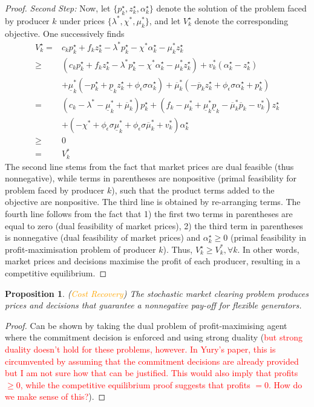 \documentclass{article}
\newtheorem{proposition}{Proposition}
\begin{document}
\begin{proof}
\textit{Second Step:} Now, let $\{p_k^\star, z_k^\star, \alpha_k^\star\}$ denote the solution of the problem faced by producer $k$ under prices $\{\lambda^*, \chi^*, \mu_k^*\}$, and let $V_k^\star$ denote the corresponding objective. One successively finds
\begin{align}
    V_k^\star =& c_k p_k^\star + f_k z_k^\star - \lambda^* p_k^\star - \chi^* \alpha_k^\star - \mu_k^*z_k^\star\\
    \ge& (c_k p_k^\star + f_k z_k^\star - \lambda^* p_k^\star - \chi^* \alpha_k^\star - \mu_k^*z_k^\star) + v_k^*(\alpha_k^\star - z_k^\star)\\
    &+ \underline{\mu}_k^*(-p_k^\star  + \underline{p}_k z_k^\star + \phi_{\epsilon} \sigma \alpha_k^\star) + \overline{\mu}_k^* (-\overline{p}_k z_k^\star + \phi_{\epsilon} \sigma \alpha_k^\star + p_k^\star)\\
    =& (c_k - \lambda^* - \underline{\mu}_k^* + \overline{\mu}_k^*) p_k^\star+(f_k - \mu_k^* + \underline{\mu}_k^* \underline{p}_k - \overline{\mu}_k^* \overline{p}_k - v_k^*) z_k^\star\\
    &+ (-\chi^* + \phi_{\epsilon} \sigma \underline{\mu}_k^* + \phi_{\epsilon} \sigma \overline{\mu}_k^* + v_k^*) \alpha_k^\star\\
    \ge& 0\\
    =& V_k^*
\end{align}
The second line stems from the fact that market prices are dual feasible (thus nonnegative), while terms in parentheses are nonpositive (primal feasibility for problem faced by producer $k$), such that the product terms added to the objective are nonpositive. The third line is obtained by re-arranging terms. The fourth line follows from the fact that 1) the first two terms in parentheses are equal to zero (dual feasibility of market prices), 2) the third term in parentheses is nonnegative (dual feasibility of market prices) and $\alpha_k^\star \ge 0$ (primal feasibility in profit-maximisation problem of producer $k$). Thus, $V_k^\star \ge V_k^*, \forall k$. In other words, market prices and decisions maximise the profit of each producer, resulting in a competitive equilibrium.
\end{proof}

\begin{proposition}
(\textcolor{orange}{Cost Recovery}) The stochastic market clearing problem produces prices and decisions that guarantee a nonnegative pay-off for flexible generators.
\end{proposition}
\begin{proof}
Can be shown by taking the dual problem of profit-maximising agent where the commitment decision is enforced and using strong duality (\textcolor{red}{but strong duality doesn't hold for these problems, however. In Yury's paper, this is circumvented by assuming that the commitment decisions are already provided but I am not sure how that can be justified. This would also imply that profits $\ge 0$, while the competitive equilibrium proof suggests that profits $= 0$. How do we make sense of this?}).
\end{proof}
\end{document}
